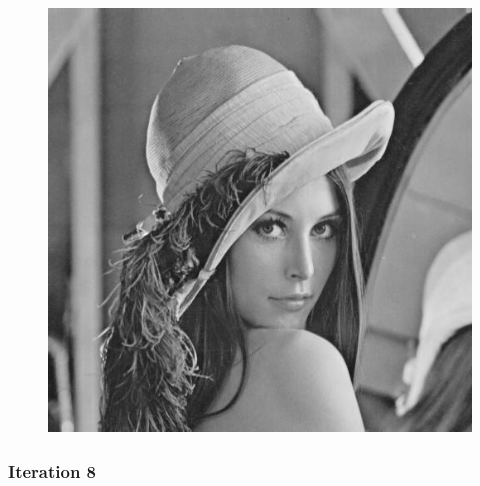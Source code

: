 \documentclass[11pt]{article}
\makeatletter
\def\maxwidth{\ifdim\Gin@nat@width>\linewidth\linewidth
    \else\Gin@nat@width\fi}
\let\Oldincludegraphics\includegraphics
\renewcommand{\includegraphics}[1]{\Oldincludegraphics[width=.8\maxwidth]{#1}}
\makeatother
\begin{document}
\begin{figure}[!htbp]
	\centering
	\includegraphics{"3th iterations_varying"}
	\label{fig:3th-iterationsvarying}
\end{figure}
\clearpage
    \hypertarget{iteration-8}{%
\subsubsection{Iteration 8}\label{iteration-8}}
\end{document}
